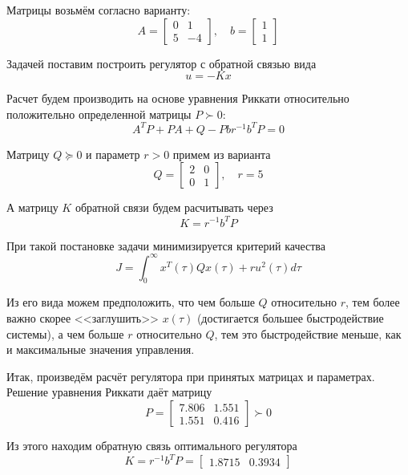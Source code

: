 \documentclass[a4paper,hidelinks,14pt]{extarticle}
\begin{document}
	Матрицы возьмём согласно варианту:
	\[
		A = \begin{bmatrix}
			0 & 1 \\
			5 & -4
		\end{bmatrix}, \quad
		b = \begin{bmatrix}
			1 \\
			1
		\end{bmatrix}
	\]

	Задачей поставим построить регулятор с обратной связью вида
	\[
		u = -Kx
	\]

	Расчет будем производить на основе уравнения Риккати относительно положительно определенной матрицы $P \succ 0$:
	\[
		A^T P + PA + Q - P b r^{-1} b^T P = 0
	\]

	Матрицу $Q \succcurlyeq 0$ и параметр $r > 0$ примем из варианта
	\[
		Q = \begin{bmatrix}
			2 & 0 \\
			0 & 1
		\end{bmatrix}, \quad
		r = 5
	\]

	А матрицу $K$ обратной связи будем расчитывать через
	\[
		K = r^{-1} b^T P
	\]

	При такой постановке задачи минимизируется критерий качества
	\[
		J = \int_0^\infty x^T(\tau) Q x(\tau) + r u^2(\tau) d\tau
	\]

	Из его вида можем предположить, что чем больше $Q$ относительно $r$, тем более важно скорее <<заглушить>> $x(\tau)$ (достигается большее быстродействие системы), а чем больше $r$ относительно $Q$, тем это быстродействие меньше, как и максимальные значения управления.

	Итак, произведём расчёт регулятора при принятых матрицах и параметрах. Решение уравнения Риккати даёт матрицу
	\[
		P = \begin{bmatrix}
			7.806 & 1.551  \\
			1.551 & 0.416 
		\end{bmatrix} \succ 0
	\]

	Из этого находим обратную связь оптимального регулятора
	\[
		K = r^{-1} b^T P = 
		\begin{bmatrix}
			1.8715 & 0.3934 
		\end{bmatrix}
	\]
\end{document}
